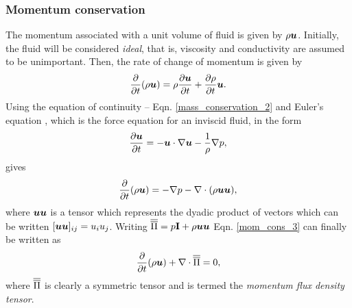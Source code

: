 \subsubsection{Momentum conservation}
The momentum associated with a unit volume of fluid is given by $\rho{\mbox{\boldmath$u$}}$. Initially, the fluid will be considered \textit{ideal}, that is, viscosity and conductivity are assumed to be unimportant. Then, the rate of change of momentum is given by
\begin{equation}\label{mom_cons_1}
 \frac{\partial}{\partial{t}}(\rho{\mbox{\boldmath$u$}})=\rho\frac{\partial{\mbox{\boldmath$u$}}}{\partial{t}}+\frac{\partial\rho}{\partial{t}}{\mbox{\boldmath$u$}}.
\end{equation}
Using the equation of continuity -- Eqn. \ref{mass_conservation_2} and Euler's equation \citep{batchelor_1967,ferziger_2002}, which is the force equation for an inviscid fluid, in the form
\begin{equation}\label{mom_cons_2}
 \frac{\partial{\mbox{\boldmath$u$}}}{\partial{t}}=-{\mbox{\boldmath$u$}}\cdot\nabla{\mbox{\boldmath$u$}}-\frac{1}{\rho}\nabla{p},
\end{equation}
gives
\begin{equation}\label{mom_cons_3}
 \frac{\partial}{\partial{t}}(\rho{\mbox{\boldmath$u$}})=-\nabla{p}-\nabla\cdot(\rho{\mbox{\boldmath$u$}}{\mbox{\boldmath$u$}}),
\end{equation}
where ${\mbox{\boldmath$u$}}{\mbox{\boldmath$u$}}$ is a tensor which represents the dyadic product of vectors which can be written $[{\mbox{\boldmath$u$}}{\mbox{\boldmath$u$}}]_{ij}=u_{i}u_{j}$. Writing $\overline{\overline{\Pi}}=p\mathbf{I}+\rho{\mbox{\boldmath$u$}}{\mbox{\boldmath$u$}}$ Eqn. \ref{mom_cons_3} can finally be written as
\begin{equation}\label{mom_cons_4}
 \frac{\partial}{\partial{t}}(\rho{\mbox{\boldmath$u$}})+\nabla\cdot\overline{\overline{\Pi}}=0,
\end{equation}
where $\overline{\overline{\Pi}}$ is clearly a symmetric tensor and is termed the \textit{momentum flux density tensor}.


